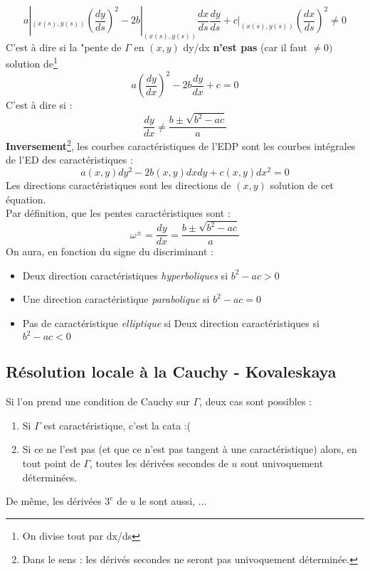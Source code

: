 \documentclass[11pt, a4paper, openany]{book}
\begin{document}
			\begin{equation}
				a|_{(x(s),y(s))} \left(\dfrac{dy}{ds}\right)^2 - 2b|_{(x(s),y(s))} \dfrac{dx}{ds}\dfrac{dy}{ds} + c|_{(x(s),y(s))}\left(\dfrac{dx}{ds}\right)^2 \neq 0
			\end{equation}
			C'est à dire si la "pente de $\Gamma$ en $(x,y)$ dy/dx \textbf{n'est pas} (car il faut $\neq 0)$ solution de\footnote{On divise tout par dx/ds}
			\begin{equation}
				a\left(\dfrac{dy}{dx}\right)^2 - 2b\dfrac{dy}{dx} + c = 0
			\end{equation}
			C'est à dire si :
			\begin{equation}
				\dfrac{dy}{dx} \neq \dfrac{b\pm \sqrt{b^2-ac}}{a}
			\end{equation}
			\textbf{Inversement}\footnote{Dans le sens : les dérivés secondes ne seront pas univoquement déterminée.}, les courbes caractéristiques de l'EDP sont les courbes intégrales de l'ED des caractéristiques :
			\begin{equation}
				a(x,y)dy^2 - 2b(x,y)dxdy + c(x,y)dx^2 = 0
			\end{equation}
			Les directions caractéristiques sont les directions de $(x,y)$ solution de cet équation.\\Par définition, que les pentes caractéristiques sont :
			\begin{equation}
				\omega^\pm = \dfrac{dy}{dx} = \dfrac{b\pm \sqrt{b^2-ac}}{a}
			\end{equation}
			On aura, en fonction du signe du discriminant :
			\begin{itemize}
				\item Deux direction caractéristiques \textit{hyperboliques} si $b^2-ac > 0$
				\item Une direction caractéristique \textit{parabolique} si $b^2-ac = 0$
				\item Pas de caractéristique \textit{elliptique} si Deux direction caractéristiques si $b^2-ac < 0$
			\end{itemize}
																
			\subsection{Résolution locale à la Cauchy - Kovaleskaya}
			Si l'on prend une condition de Cauchy sur $\Gamma$, deux cas sont possibles :
			\begin{enumerate}
				\item Si $\Gamma$ est caractéristique, c'est la cata :(
				\item Si ce ne l'est pas (et que ce n'est pas tangent à une caractéristique) alors, en tout point de $\Gamma$, toutes les dérivées secondes de $u$ sont univoquement déterminées.
			\end{enumerate}
			De même, les dérivées $3^e$ de $u$ le sont aussi, $\dots$\\
																
\end{document}
